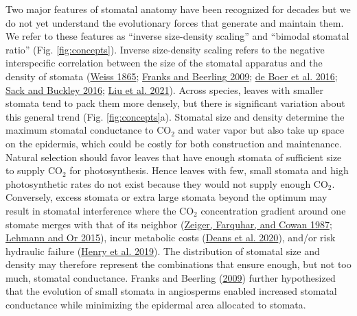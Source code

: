 \documentclass[
  12pt,
]{article}
\begin{document}
Two major features of stomatal anatomy have been recognized for decades but we do not yet understand the evolutionary forces that generate and maintain them. We refer to these features as ``inverse size-density scaling'' and ``bimodal stomatal ratio'' (Fig. \ref{fig:concepts}). Inverse size-density scaling refers to the negative interspecific correlation between the size of the stomatal apparatus and the density of stomata (\protect\hyperlink{ref-weiss_untersuchungen_1865}{Weiss 1865}; \protect\hyperlink{ref-franks_maximum_2009}{Franks and Beerling 2009}; \protect\hyperlink{ref-de_boer_optimal_2016}{de Boer et al. 2016}; \protect\hyperlink{ref-sack_developmental_2016}{Sack and Buckley 2016}; \protect\hyperlink{ref-liu_scaling_2021}{Liu et al. 2021}). Across species, leaves with smaller stomata tend to pack them more densely, but there is significant variation about this general trend (Fig. \ref{fig:concepts}a). Stomatal size and density determine the maximum stomatal conductance to CO\(_2\) and water vapor but also take up space on the epidermis, which could be costly for both construction and maintenance. Natural selection should favor leaves that have enough stomata of sufficient size to supply CO\(_2\) for photosynthesis. Hence leaves with few, small stomata and high photosynthetic rates do not exist because they would not supply enough CO\(_2\). Conversely, excess stomata or extra large stomata beyond the optimum may result in stomatal interference where the CO\(_2\) concentration gradient around one stomate merges with that of its neighbor (\protect\hyperlink{ref-zeiger_stomatal_1987}{Zeiger, Farquhar, and Cowan 1987}; \protect\hyperlink{ref-lehmann_effects_2015}{Lehmann and Or 2015}), incur metabolic costs (\protect\hyperlink{ref-deans_optimization_2020}{Deans et al. 2020}), and/or risk hydraulic failure (\protect\hyperlink{ref-henry_stomatal_2019}{Henry et al. 2019}). The distribution of stomatal size and density may therefore represent the combinations that ensure enough, but not too much, stomatal conductance. Franks and Beerling (\protect\hyperlink{ref-franks_maximum_2009}{2009}) further hypothesized that the evolution of small stomata in angiosperms enabled increased stomatal conductance while minimizing the epidermal area allocated to stomata.
\end{document}
